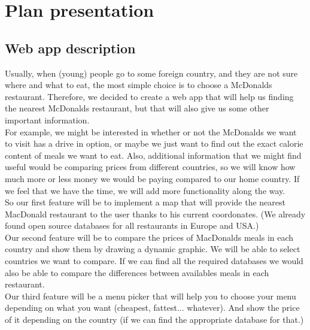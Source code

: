 \documentclass[12pt]{article}
\begin{document}
    {\color{color_section}\section{Plan presentation}}
        {\color{color_subsection}\subsection{Web app description}}
        
        Usually, when (young) people go to some foreign country, and they
        are not sure where and what to eat, the most simple choice is to
        choose a McDonalds restaurant. Therefore, we decided to create a web 
        app that will help us finding the nearest McDonalds restaurant, 
        but that will also give us some other important information.\\
        
        \noindent For example, we might be interested in whether or not the McDonalds we want 
        to visit has a drive in option, or maybe we just want to find out 
        the exact calorie content of meals we want to eat. Also, additional 
        information that we might find useful would be comparing prices from 
        different countries, so we will know how much more or less money we would be 
        paying compared to our home country. If we feel that we 
        have the time, we will add more functionality along the way.\\

        \noindent So our first feature will be to implement a map that will provide
        the nearest MacDonald restaurant to the user thanks to his current coordonates.
        (We already found open source databases for all restaurants in Europe and USA.)\\

        \noindent Our second feature will be to compare the prices of MacDonalds meals
        in each country and show them by drawing a dynamic graphic. We will be
        able to select countries we want to compare. If we can find all the
        required databases we would also be able to compare the differences
        between availables meals in each restaurant.\\

        \noindent Our third feature will be a menu picker that will help you to choose
        your menu depending on what you want (cheapest, fattest... whatever).
        And show the price of it depending on the country (if we can find the
        appropriate database for that.)\\
\end{document}
